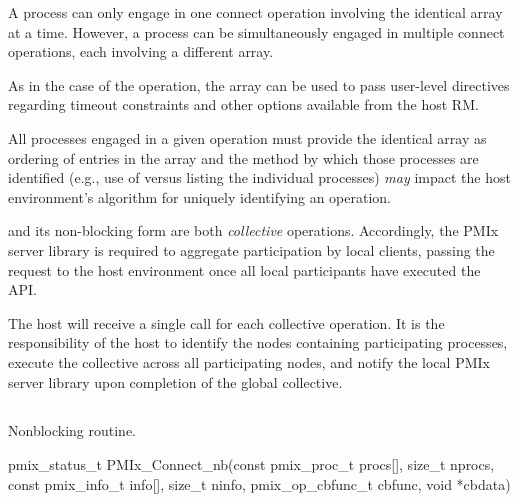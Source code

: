 A process can only engage in one connect operation involving the identical  array at a time.
However, a process can be simultaneously engaged in multiple connect operations, each involving a different  array.

As in the case of the  operation, the  array can be used to pass user-level directives regarding timeout constraints and other options available from the host \ac{RM}.

\adviceuserstart
All processes engaged in a given  operation must provide the identical  array as ordering of entries in the array and the method by which those processes are identified (e.g., use of  versus listing the individual processes) \textit{may} impact the host environment's algorithm for uniquely identifying an operation.
\adviceuserend

\adviceimplstart
{} and its non-blocking form are both \emph{collective} operations. Accordingly, the \ac{PMIx} server library is required to aggregate participation by local clients, passing the request to the host environment once all local participants have executed the \ac{API}.
\adviceimplend

\advicermstart
The host will receive a single call for each collective operation. It is the responsibility of the host to identify the nodes containing participating processes, execute the collective across all participating nodes, and notify the local \ac{PMIx} server library upon completion of the global collective.
\advicermend


\subsection{}

\summary

Nonblocking  routine.

\format

\cspecificstart
\begin{codepar}
pmix_status_t
PMIx_Connect_nb(const pmix_proc_t procs[], size_t nprocs,
                const pmix_info_t info[], size_t ninfo,
                pmix_op_cbfunc_t cbfunc, void *cbdata)
\end{codepar}
\cspecificend

